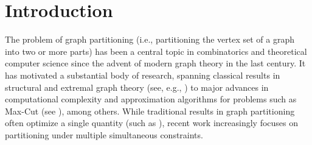 \documentclass{aic}
\begin{document}
\section{Introduction}
	\noindent
	The problem of graph partitioning (i.e., partitioning the vertex set of a graph into two or more parts) has been a central topic in combinatorics and theoretical computer science since the advent of modern graph theory in the last century.
	It has motivated a substantial body of research, spanning classical results in structural and extremal graph theory (see, e.g., \cite{Lov,Ed73,Ed75}) to major advances in computational complexity and approximation algorithms for problems such as Max-Cut (see \cite{Karp,GW}), among others.
	While traditional results in graph partitioning often optimize a single quantity (such as \cite{Ed73,Ed75,GW}),
	recent work increasingly focuses on partitioning under multiple simultaneous constraints.
	
\end{document}

